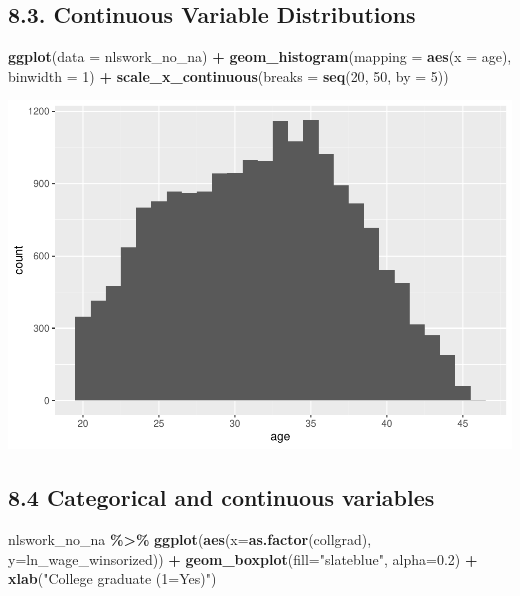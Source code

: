 \documentclass[
]{article}
\newenvironment{Shaded}{\begin{snugshade}}{\end{snugshade}}
\newcommand{\AttributeTok}[1]{\textcolor[rgb]{0.13,0.29,0.53}{#1}}
\newcommand{\DecValTok}[1]{\textcolor[rgb]{0.00,0.00,0.81}{#1}}
\newcommand{\FloatTok}[1]{\textcolor[rgb]{0.00,0.00,0.81}{#1}}
\newcommand{\FunctionTok}[1]{\textcolor[rgb]{0.13,0.29,0.53}{\textbf{#1}}}
\newcommand{\NormalTok}[1]{#1}
\newcommand{\SpecialCharTok}[1]{\textcolor[rgb]{0.81,0.36,0.00}{\textbf{#1}}}
\newcommand{\StringTok}[1]{\textcolor[rgb]{0.31,0.60,0.02}{#1}}
\begin{document}
\hypertarget{continuous-variable-distributions}{%
\subsection{8.3. Continuous Variable
Distributions}\label{continuous-variable-distributions}}

\begin{Shaded}
\begin{Highlighting}[]
\FunctionTok{ggplot}\NormalTok{(}\AttributeTok{data =}\NormalTok{ nlswork\_no\_na) }\SpecialCharTok{+} \FunctionTok{geom\_histogram}\NormalTok{(}\AttributeTok{mapping =} \FunctionTok{aes}\NormalTok{(}\AttributeTok{x =}\NormalTok{ age), }\AttributeTok{binwidth =} \DecValTok{1}\NormalTok{) }\SpecialCharTok{+} 
  \FunctionTok{scale\_x\_continuous}\NormalTok{(}\AttributeTok{breaks =} \FunctionTok{seq}\NormalTok{(}\DecValTok{20}\NormalTok{, }\DecValTok{50}\NormalTok{, }\AttributeTok{by =} \DecValTok{5}\NormalTok{))}
\end{Highlighting}
\end{Shaded}

\includegraphics{RIntro_files/figure-latex/unnamed-chunk-25-1.pdf}

\hypertarget{categorical-and-continuous-variables}{%
\subsection{8.4 Categorical and continuous
variables}\label{categorical-and-continuous-variables}}

\begin{Shaded}
\begin{Highlighting}[]
\NormalTok{nlswork\_no\_na }\SpecialCharTok{\%\textgreater{}\%} \FunctionTok{ggplot}\NormalTok{(}\FunctionTok{aes}\NormalTok{(}\AttributeTok{x=}\FunctionTok{as.factor}\NormalTok{(collgrad), }\AttributeTok{y=}\NormalTok{ln\_wage\_winsorized)) }\SpecialCharTok{+}
  \FunctionTok{geom\_boxplot}\NormalTok{(}\AttributeTok{fill=}\StringTok{"slateblue"}\NormalTok{, }\AttributeTok{alpha=}\FloatTok{0.2}\NormalTok{) }\SpecialCharTok{+} 
  \FunctionTok{xlab}\NormalTok{(}\StringTok{"College graduate (1=Yes)"}\NormalTok{)}
\end{Highlighting}
\end{Shaded}
\end{document}
